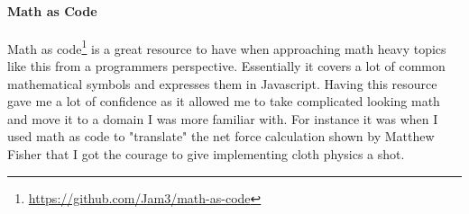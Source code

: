 \paragraph{Math as Code}
Math as code\footnote{\url{https://github.com/Jam3/math-as-code}} is a great resource to have when approaching math heavy topics like this from a programmers perspective.
Essentially it covers a lot of common mathematical symbols and expresses them in Javascript. 
Having this resource gave me a lot of confidence as it allowed me to take complicated looking math and move it to a domain I was more familiar with.
For instance it was when I used math as code to "translate" the net force calculation shown by Matthew Fisher\cite{matthew_fisher} that I got the courage to give implementing cloth physics a shot.


